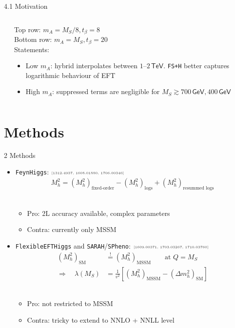\documentclass[hyperref={pdfpagelabels=false},ngerman]{beamer}
\newcommand{\cmark}{\ding{51}}%
\newcommand{\xmark}{\ding{55}}%
\newcommand{\eh}[1]{\,\mathsf{#1}}
\newcommand{\GeV}{\eh{GeV}}
\newcommand{\TeV}{\eh{TeV}}
\newcommand{\ok}{\textcolor{darkgreen}{\cmark}}
\newcommand{\notok}{\textcolor{red}{\xmark}}
\newcommand{\MS}{\ensuremath{M_S}}
\newcommand{\mycite}[1]{\ensuremath{\text{\textcolor{darkgray}{\tiny [#1]}}}}
\newcommand{\SM}{\ensuremath{\text{SM}}}
\newcommand{\MSSM}{\ensuremath{\text{MSSM}}}
\newcommand{\feft}{\texttt{FlexibleEFTHiggs}\xspace}
\newcommand{\FH}{\texttt{FeynHiggs}\xspace}
\newcommand{\SPheno}{\texttt{SPheno}\xspace}
\newcommand{\SARAH}{\texttt{SARAH}\xspace}
\begin{document}
\begin{frame}{4.1 Motivation}
\begin{columns}
\begin{column}{0.6\textwidth}
\begin{center}
      \end{center}
    \end{column}
    \begin{column}{0.4\textwidth}
      Top row: $m_A = \MS/8, t_\beta = 8$\\[1em]
      Bottom row: $m_A = \MS, t_\beta = 20$\\[1em]
      Statements:
      \begin{itemize}
      \item Low $m_A$: hybrid interpolates between $1$--$2\TeV$.
        \texttt{FS+H} better captures logarithmic behaviour of EFT
      \item High $m_A$: suppressed terms are negligible for
        $\MS \gtrsim 700\GeV, 400\GeV$
      \end{itemize}
    \end{column}
  \end{columns}
\end{frame}

\section{Methods}

\begin{frame}{2 Methods}
  \begin{itemize}
  \item \FH: \mycite{1312.4937, 1608.01880, 1706.00346}
    \begin{align*}
      M_h^2 = (M_h^2)_{\text{fixed-order}} - (M_h^2)_{\text{logs}} + (M_h^2)_{\text{resummed logs}}
    \end{align*}\\[-0.5em]
    \begin{itemize}
    \item[\ok] Pro: 2L accuracy available, complex parameters
    \item[\notok] Contra: currently only MSSM
    \end{itemize}
  \item \feft and \SARAH/\SPheno: \mycite{1609.00371, 1703.03267, 1710.03760}
    \begin{align*}
      (M_h^2)_{\SM} &\overset{!}{=} (M_h^2)_{\MSSM} \qquad \text{at } Q = \MS \\
      \Rightarrow\quad \lambda(\MS) &= \frac{1}{v^2} \left[ (M_h^2)_{\MSSM} - (\Delta m_h^2)_{\SM} \right]
    \end{align*}\\[-0.5em]
    \begin{itemize}
    \item[\ok] Pro: not restricted to MSSM
    \item[\notok] Contra: tricky to extend to NNLO + NNLL level
    \end{itemize}
  \end{itemize}
\end{frame}
\end{document}
